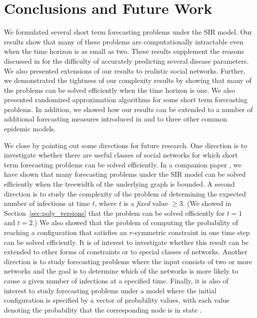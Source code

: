\section{Conclusions and Future Work}
\label{sec:concl}

We formulated several short term forecasting problems under
the SIR model. 
Our results show that many of these problems are computationally
intractable even when the time horizon is as small as two.
These results supplement the reasons discussed in
\cite{Drake-2005,Drake-2006} for the difficulty of accurately predicting
several disease parameters. 
We also presented extensions of our results to realistic 
social networks.
Further, we demonstrated the tightness of our complexity results 
by showing that many of the problems can be solved efficiently
when the time horizon is one.
We also presented randomized approximation algorithms for 
some short term forecasting problems. 
In addition, we showed how our results can be extended to a
number of additional forecasting measures introduced in \cite{TC+2016}
and to three other common epidemic models. 

We close by pointing out some directions for future research.
One direction is to investigate whether there are useful classes
of social networks for which short term forecasting problems can be
solved efficiently. 
In a companion paper \cite{Rosenkrantz_etal_2016}, we have
shown that many forecasting problems under the SIR model can be solved efficiently
when the treewidth of the underlying graph is bounded.
A second direction is to study the complexity of the problem of 
determining the expected number of infections at time $t$, 
where $t$ is a \emph{fixed} value $\geq 3$. 
(We showed in Section~\ref{sec:poly_versions} that the problem can be 
solved efficiently for $t = 1$ and $t = 2$.) 
We also showed that the problem of computing the probability 
of reaching a configuration
that satisfies an $r$-symmetric constraint in one time step
can be solved efficiently.
It is of interest to investigate whether this result can be
extended to other forms of constraints or to special classes of
networks.
Another direction is to study forecasting problems where the input consists
of two or more networks and the goal is to determine which of the networks 
is more likely to cause a given number of infections at a specified time.
Finally, it is also of interest to study forecasting problems
under a model where the initial configuration is specified by a 
vector of probability values, with each value denoting the probability
that the corresponding node is in state \istate{}.
